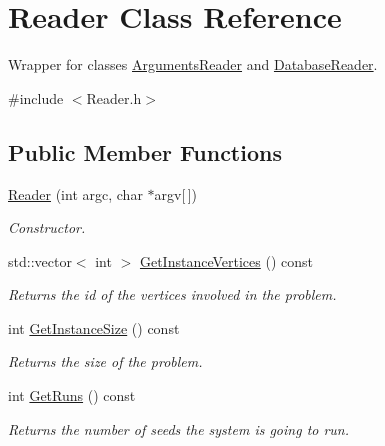 \hypertarget{classReader}{}\section{Reader Class Reference}
\label{classReader}


Wrapper for classes \hyperlink{classArgumentsReader}{Arguments\+Reader} and \hyperlink{classDatabaseReader}{Database\+Reader}.  




{\ttfamily \#include $<$Reader.\+h$>$}

\subsection*{Public Member Functions}
\begin{DoxyCompactItemize}
\item 
\hyperlink{classReader_a129e7447005ec95a13d937ad294f1d14}{Reader} (int argc, char $\ast$argv\mbox{[}$\,$\mbox{]})
\begin{DoxyCompactList}\small\item\em Constructor. \end{DoxyCompactList}\item 
\mbox{\label{classReader_a4ff3f9184c27575b8dae12ece29e357e}} 
std\+::vector$<$ int $>$ \hyperlink{classReader_a4ff3f9184c27575b8dae12ece29e357e}{Get\+Instance\+Vertices} () const
\begin{DoxyCompactList}\small\item\em Returns the id of the vertices involved in the problem. \end{DoxyCompactList}\item 
\mbox{\label{classReader_aedd397ac26442e769042c1c2d2df133b}} 
int \hyperlink{classReader_aedd397ac26442e769042c1c2d2df133b}{Get\+Instance\+Size} () const
\begin{DoxyCompactList}\small\item\em Returns the size of the problem. \end{DoxyCompactList}\item 
\mbox{\label{classReader_a7432277417e9d4ae23ad9cb14fdf0951}} 
int \hyperlink{classReader_a7432277417e9d4ae23ad9cb14fdf0951}{Get\+Runs} () const
\begin{DoxyCompactList}\small\item\em Returns the number of seeds the system is going to run. \end{DoxyCompactList}\item 

\end{DoxyCompactItemize}
